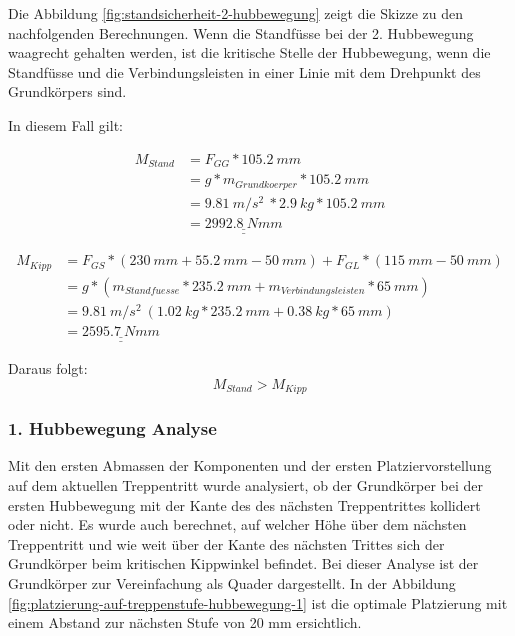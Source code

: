 Die Abbildung \ref{fig:standsicherheit-2-hubbewegung} zeigt die Skizze zu den nachfolgenden Berechnungen. Wenn die Standfüsse bei der 2. Hubbewegung waagrecht gehalten werden, ist die kritische Stelle der Hubbewegung, wenn die Standfüsse und die Verbindungsleisten in einer Linie mit dem Drehpunkt des Grundkörpers sind.

In diesem Fall gilt:

\begin{align*}
    M_{Stand} &= F_{GG} * 105.2\ mm \\
    &= g * m_{Grundkoerper} * 105.2\ mm \\
    &= 9.81\ m/s^2\ * 2.9\ kg * 105.2\ mm \\
    &= \underline{\underline{2992.8\ Nmm}}
\end{align*}

\begin{align*}
    M_{Kipp}  &= F_{GS} * (230\ mm + 55.2\ mm - 50\ mm) + F_{GL} * (115\ mm - 50\ mm) \\
    &= g * (m_{Standfuesse} * 235.2\ mm + m_{Verbindungsleisten} * 65\ mm) \\
    &= 9.81\ m/s^2\ (1.02\ kg * 235.2\ mm + 0.38\ kg * 65\ mm) \\
    &= \underline{\underline{2595.7\ Nmm}}
\end{align*}
  
Daraus folgt:
\[M_{Stand} > M_{Kipp}\]

\subsubsection{1. Hubbewegung Analyse}
\label{sec:hubbewegung-analyse}
Mit den ersten Abmassen der Komponenten und der ersten Platziervorstellung auf dem aktuellen Treppentritt wurde analysiert, ob der Grundkörper bei der ersten Hubbewegung mit der Kante des des nächsten Treppentrittes kollidert oder nicht. Es wurde auch berechnet, auf welcher Höhe über dem nächsten Treppentritt und wie weit über der Kante des nächsten Trittes sich der Grundkörper beim kritischen Kippwinkel befindet. Bei dieser Analyse ist der Grundkörper zur Vereinfachung als Quader dargestellt. In der Abbildung \ref{fig:platzierung-auf-treppenstufe-hubbewegung-1} ist die optimale Platzierung mit einem Abstand zur nächsten Stufe von 20 mm ersichtlich.

